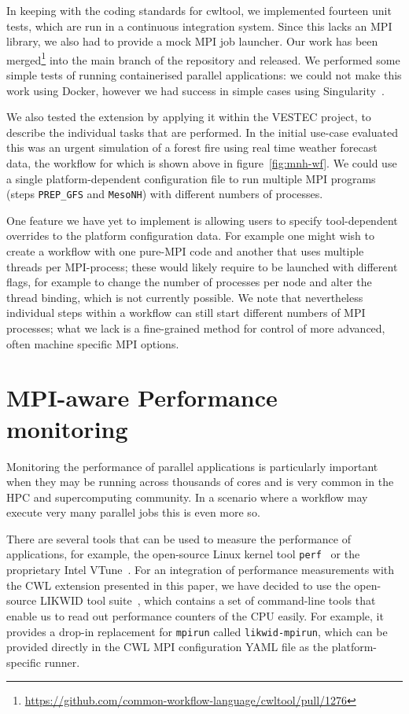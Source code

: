 \documentclass[conference]{IEEEtran}
\begin{document}
In keeping with the coding standards for cwltool, we implemented fourteen unit tests, which are run in a continuous integration system. Since this lacks an MPI library, we also had to provide a mock MPI job launcher. Our work has been merged\footnote{\url{https://github.com/common-workflow-language/cwltool/pull/1276}} into the main branch of the repository and released. We performed some simple tests of running containerised parallel applications: we could not make this work using Docker, however we had success in simple cases using Singularity~\cite{singularity}.

We also tested the extension by applying it within the VESTEC project, to describe the individual tasks that are performed. In the initial use-case evaluated this was an urgent simulation of a forest fire using real time weather forecast data, the workflow for which is shown above in figure~\ref{fig:mnh-wf}. We could use a single platform-dependent configuration file to run multiple MPI programs (steps \verb`PREP_GFS` and \verb`MesoNH`) with different numbers of processes.

One feature we have yet to implement is allowing users to specify tool-dependent overrides to the platform configuration data. For example one might wish to create a workflow with one pure-MPI code and another that uses multiple threads per MPI-process; these would likely require to be launched with different flags, for example to change the number of processes per node and alter the thread binding, which is not currently possible.  We note that nevertheless individual steps within a workflow can still start different numbers of MPI processes; what we lack is a fine-grained method for control of more advanced, often machine specific MPI options.

\section{MPI-aware Performance monitoring}
\label{sec:performance}

Monitoring the performance of parallel applications is particularly important when they may be running across thousands of cores and is very common in the HPC and supercomputing community.
In a scenario where a workflow may execute very many parallel jobs this is even more so.

There are several tools that can be used to measure the performance of applications, for example, the open-source Linux kernel tool \texttt{perf}~\cite{perf} or the proprietary Intel VTune~\cite{vtune}.
For an integration of performance measurements with the CWL extension presented in this paper, we have decided to use the open-source LIKWID tool suite~\cite{likwid_paper, likwid_web}, which contains a set of command-line tools that enable us to read out performance counters of the CPU easily. 
For example, it provides a drop-in replacement for \texttt{mpirun} called \texttt{likwid-mpirun}, which can be provided directly in the CWL MPI configuration YAML file as the platform-specific runner.
\end{document}
